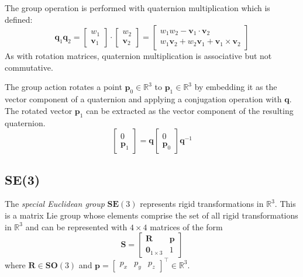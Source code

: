 		The group operation is performed with quaternion multiplication which is defined:
		\begin{equation}
			\mathbf{q}_1\mathbf{q}_2 =
			\begin{bmatrix}
			 	w_1 \\
			 	\mathbf{v}_1
			\end{bmatrix} 
			\cdot
			\begin{bmatrix}
			 	w_2 \\
			 	\mathbf{v}_2
			\end{bmatrix} 
			=
			\begin{bmatrix}
			 	w_1w_2 - \mathbf{v}_1 \cdot \mathbf{v}_2 \\
			 	w_1\mathbf{v}_2 + w_2\mathbf{v}_1 + \mathbf{v}_1 \times \mathbf{v}_2
			\end{bmatrix} 
		\end{equation} 
		As with rotation matrices, quaternion multiplication is associative but not commutative.
		
		The group action rotates a point $\mathbf{p}_0 \in \mathbb{R}^3$  to $\mathbf{p}_1 \in \mathbb{R}^3$ by embedding it as the vector component of a quaternion and applying a conjugation operation with $\mathbf{q}$. The rotated vector $\mathbf{p}_1$ can be extracted as the vector component of the resulting quaternion.
		\begin{equation} \label{quatrot}
			\begin{bmatrix}
			 	0\\
			 	\mathbf{p}_1
			\end{bmatrix}
			= \mathbf{q}
			\begin{bmatrix}
			 	0\\
			 	\mathbf{p}_0
			\end{bmatrix}
			\mathbf{q}^{-1}
		\end{equation}
		
	\subsection{\textbf{SE}(3)}	
		The \textit{special Euclidean group} $\textbf{SE}(3)$ represents rigid transformations in $\mathbb{R}^3$. This is a matrix Lie group whose elements comprise the set of all rigid transformations in $\mathbb{R}^3$ and can be represented with $4 \times 4$ matrices of the form
		\begin{equation}
			\textbf{S} = 
			\begin{bmatrix}
				  \mathbf{R}	&	\mathbf{p} \\
				  \textbf{0}_{1 \times 3}		& 	1 
			\end{bmatrix}
		\end{equation}
		where $\mathbf{R} \in \mathbf{SO}(3)$ and 
		$\mathbf{p} = 
		\begin{bmatrix}
			p_x	& p_y & p_z				
		\end{bmatrix}
		^\top \in \mathbb{R}^3$.
		

